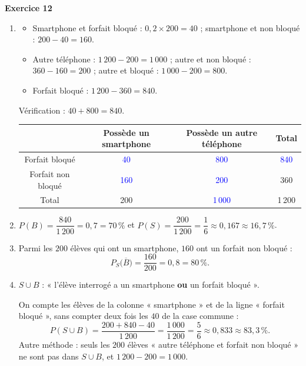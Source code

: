 \documentclass[a4paper,11pt]{article}
\newenvironment{exercice}[1]{%
  \Needspace{6\baselineskip}\par\bigskip\noindent\textbf{Exercice #1}\par\smallskip\noindent\ignorespaces
}{%
  \par
}
\newcommand{\val}[1]{\textcolor{blue}{#1}}
\begin{document}
\begin{exercice}{12}
\begin{enumerate}[label=\arabic*.]
\item
\begin{itemize}[label=$\bullet$]
\item Smartphone et forfait bloqué : $0{,}2\times 200=40$ ; smartphone et non bloqué : $200-40=160$.
\item Autre téléphone : $1\,200-200=1\,000$ ; autre et non bloqué : $360-160=200$ ; autre et bloqué : $1\,000-200=800$.
\item Forfait bloqué : $1\,200-360=840$.
\end{itemize}
Vérification : $40+800=840$.

\begin{center}
\begin{tabular}{|c|c|c|c|}
\hline
 & Possède un smartphone & Possède un autre téléphone & Total \\ \hline
Forfait bloqué & \val{40} & \val{800} & \val{840} \\ \hline
Forfait non bloqué & \val{160} & \val{200} & 360 \\ \hline
Total & 200 & \val{1\,000} & 1\,200 \\ \hline
\end{tabular}
\end{center}
\item $P(B)=\dfrac{840}{1\,200}=0{,}7=70\,\%$ \qquad et \qquad $P(S)=\dfrac{200}{1\,200}=\dfrac{1}{6}\approx 0{,}167\approx 16{,}7\,\%$.
\item Parmi les $200$ élèves qui ont un smartphone, $160$ ont un forfait non bloqué :
\[P_S\big(\overline{B}\big)=\dfrac{160}{200}=0{,}8=80\,\%.\]
\item $S\cup B$ : « l'élève interrogé a un smartphone \textbf{ou} un forfait bloqué ».

On compte les élèves de la colonne « smartphone » et de la ligne « forfait bloqué », sans compter deux fois les $40$ de la case commune :
\[P(S\cup B)=\dfrac{200+840-40}{1\,200}=\dfrac{1\,000}{1\,200}=\dfrac{5}{6}\approx 0{,}833\approx 83{,}3\,\%.\]
Autre méthode : seuls les $200$ élèves « autre téléphone et forfait non bloqué » ne sont pas dans $S\cup B$, et $1\,200-200=1\,000$.
\end{enumerate}
\end{exercice}
\end{document}
